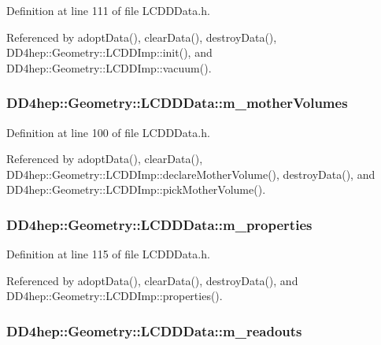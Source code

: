 Definition at line 111 of file LCDDData.h.

Referenced by adoptData(), clearData(), destroyData(), DD4hep::Geometry::LCDDImp::init(), and DD4hep::Geometry::LCDDImp::vacuum().\hypertarget{class_d_d4hep_1_1_geometry_1_1_l_c_d_d_data_a3d9a2d83bdb9c5784b51439c857f7f5f}{
\subsubsection[{m\_\-motherVolumes}]{ {\bf DD4hep::Geometry::LCDDData::m\_\-motherVolumes}}}
\label{class_d_d4hep_1_1_geometry_1_1_l_c_d_d_data_a3d9a2d83bdb9c5784b51439c857f7f5f}


Definition at line 100 of file LCDDData.h.

Referenced by adoptData(), clearData(), DD4hep::Geometry::LCDDImp::declareMotherVolume(), destroyData(), and DD4hep::Geometry::LCDDImp::pickMotherVolume().\hypertarget{class_d_d4hep_1_1_geometry_1_1_l_c_d_d_data_a5dd25d2999fe2c6687c41fb4871aac21}{
\subsubsection[{m\_\-properties}]{ {\bf DD4hep::Geometry::LCDDData::m\_\-properties}}}
\label{class_d_d4hep_1_1_geometry_1_1_l_c_d_d_data_a5dd25d2999fe2c6687c41fb4871aac21}


Definition at line 115 of file LCDDData.h.

Referenced by adoptData(), clearData(), destroyData(), and DD4hep::Geometry::LCDDImp::properties().\hypertarget{class_d_d4hep_1_1_geometry_1_1_l_c_d_d_data_a75b8c8f3d2ebb4dd5dac3a90d297ca11}{
\subsubsection[{m\_\-readouts}]{ {\bf DD4hep::Geometry::LCDDData::m\_\-readouts}}}
\label{class_d_d4hep_1_1_geometry_1_1_l_c_d_d_data_a75b8c8f3d2ebb4dd5dac3a90d297ca11}


